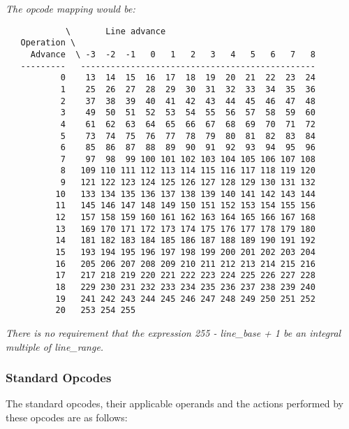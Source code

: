 \textit{The opcode mapping would be:}
\begin{verbatim}
            \       Line advance
   Operation \
     Advance  \ -3  -2  -1   0   1   2   3   4   5   6   7   8
   ---------   -----------------------------------------------
           0    13  14  15  16  17  18  19  20  21  22  23  24
           1    25  26  27  28  29  30  31  32  33  34  35  36
           2    37  38  39  40  41  42  43  44  45  46  47  48
           3    49  50  51  52  53  54  55  56  57  58  59  60
           4    61  62  63  64  65  66  67  68  69  70  71  72
           5    73  74  75  76  77  78  79  80  81  82  83  84
           6    85  86  87  88  89  90  91  92  93  94  95  96
           7    97  98  99 100 101 102 103 104 105 106 107 108
           8   109 110 111 112 113 114 115 116 117 118 119 120
           9   121 122 123 124 125 126 127 128 129 130 131 132
          10   133 134 135 136 137 138 139 140 141 142 143 144
          11   145 146 147 148 149 150 151 152 153 154 155 156
          12   157 158 159 160 161 162 163 164 165 166 167 168
          13   169 170 171 172 173 174 175 176 177 178 179 180
          14   181 182 183 184 185 186 187 188 189 190 191 192
          15   193 194 195 196 197 198 199 200 201 202 203 204
          16   205 206 207 208 209 210 211 212 213 214 215 216
          17   217 218 219 220 221 222 223 224 225 226 227 228 
          18   229 230 231 232 233 234 235 236 237 238 239 240 
          19   241 242 243 244 245 246 247 248 249 250 251 252
          20   253 254 255
\end{verbatim}


\textit{There is no requirement that the expression 
255 - line\_base + 1 be an integral multiple of
line\_range. }

\subsubsection{Standard Opcodes}
\label{chap:standardopcodes}


The standard opcodes, their applicable operands and the
actions performed by these opcodes are as follows:

